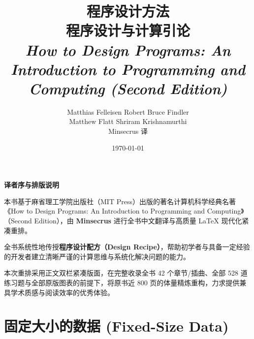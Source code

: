 \documentclass[UTF8,10pt,twocolumn,openany]{ctexbook}
\title{\Huge\textbf{\color{NavyTheme}程序设计方法}\\[1.5ex]
\LARGE\textbf{程序设计与计算引论}\\[1ex]
\large\textit{How to Design Programs: An Introduction to Programming and Computing (Second Edition)}}
\author{\Large Matthias Felleisen \quad Robert Bruce Findler \\[0.5ex]
\Large Matthew Flatt \quad Shriram Krishnamurthi\\[2ex]
\large Minsecrus 译}
\date{\today}
\begin{document}
\frontmatter
\maketitle

\clearpage
\onecolumn
\thispagestyle{empty}
\vspace*{\fill}
\begin{center}
\begin{minipage}{0.75\textwidth}
  \begin{center}
    {\Large\bfseries\color{NavyTheme} 译者序与排版说明}\\[2em]
  \end{center}
  \setlength{\parindent}{2\ccwd}
  \linespread{1.35}\selectfont
  本书基于麻省理工学院出版社（MIT Press）出版的著名计算机科学经典名著《How to Design Programs: An Introduction to Programming and Computing》（Second Edition），由 \textbf{Minsecrus} 进行全书中文翻译与高质量 \LaTeX{} 现代化紧凑重排。

  全书系统性地传授\textbf{程序设计配方（Design Recipe）}，帮助初学者与具备一定经验的开发者建立清晰严谨的计算思维与系统化解决问题的能力。

  本次重排采用正文双栏紧凑版面，在完整收录全书 42 个章节/插曲、全部 528 道练习题与全部原版图表的前提下，将原书近 800 页的体量精炼重构，力求提供兼具学术质感与阅读效率的优秀体验。
\end{minipage}
\end{center}
\vspace*{\fill}
\clearpage
\onecolumn
{}
\pagestyle{plain}

\tableofcontents

\clearpage
{}
\pagestyle{fancy}
\twocolumn




\mainmatter

\part{固定大小的数据 (Fixed-Size Data)}








\end{document}

